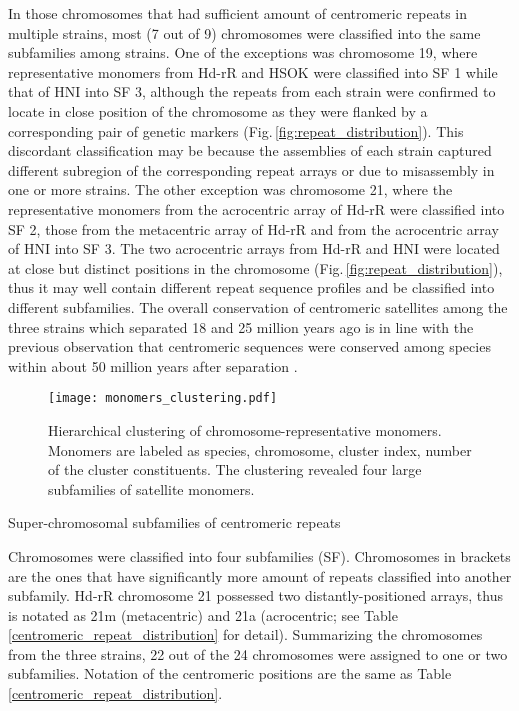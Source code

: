   In those chromosomes that had sufficient amount of centromeric repeats in multiple strains, most (7 out of 9) chromosomes were classified into the same subfamilies among strains. One of the exceptions was chromosome 19, where representative monomers from Hd-rR and HSOK were classified into SF 1 while that of HNI into SF 3, although the repeats from each strain were confirmed to locate in close position of the chromosome as they were flanked by a corresponding pair of genetic markers (Fig.\,\ref{fig:repeat_distribution}). This discordant classification may be because the assemblies of each strain captured different subregion of the corresponding repeat arrays or due to misassembly in one or more strains. The other exception was chromosome 21, where the representative monomers from the acrocentric array of Hd-rR were classified into SF 2, those from the metacentric array of Hd-rR and from the acrocentric array of HNI into SF 3. The two acrocentric arrays from Hd-rR and HNI were located at close but distinct positions in the chromosome (Fig.\,\ref{fig:repeat_distribution}), thus it may well contain different repeat sequence profiles and be classified into different subfamilies. The overall conservation of centromeric satellites among the three strains which separated 18 and 25 million years ago is in line with the previous observation that centromeric sequences were conserved among species within about 50 million years after separation \cite{Melters2013}.

  \begin{figure*}
    \centering
    \texttt{[image: monomers\_clustering.pdf]}
    \caption{
      Hierarchical clustering of chromosome-representative monomers. Monomers are labeled as species, chromosome, cluster index, number of the cluster constituents. The clustering revealed four large subfamilies of satellite monomers.
    }
    \label{monomer_clustering}
  \end{figure*}

  \begin{table*}
    \centering
    \caption{Super-chromosomal subfamilies of centromeric repeats}
    
    \label{super_chromosomal_subfamily}
    \caption*{{\small
      Chromosomes were classified into four subfamilies (SF). Chromosomes in brackets are the ones that have significantly more amount of repeats classified into another subfamily. Hd-rR chromosome 21 possessed two distantly-positioned arrays, thus is notated as 21m (metacentric) and 21a (acrocentric; see Table \ref{centromeric_repeat_distribution} for detail). Summarizing the chromosomes from the three strains, 22 out of the 24 chromosomes were assigned to one or two subfamilies. Notation of the centromeric positions are the same as Table \ref{centromeric_repeat_distribution}.
    }}
  \end{table*}


